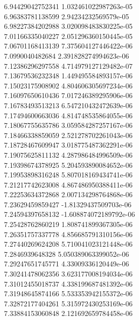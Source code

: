 {6.94429042752341 1.032461022987263e-05 \\
6.96383781138599 2.94234232569579e-05 \\
6.98227384202988 3.020098483830225e-05 \\
7.01166335040227 2.051296360150445e-05 \\
7.06701168413139 7.375604127446422e-06 \\
7.0990040482684 2.391828274994623e-06 \\
7.12386296297558 4.714979127129482e-07 \\
7.13679536232348 1.449495584893157e-06 \\
7.15023175908902 4.804606305697234e-06 \\
7.16097650610436 7.017246389295906e-06 \\
7.16783493513213 6.547210432472639e-06 \\
7.17494600663036 4.814748535864055e-06 \\
7.18067755635786 3.059584287257167e-06 \\
7.18466338859059 2.521278702261043e-06 \\
7.18728467609947 3.018775487362291e-06 \\
7.19075625811132 4.287986484996509e-06 \\
7.19398674378925 5.204593890084652e-06 \\
7.19953898316248 5.807018169434741e-06 \\
7.21217742623008 4.867486950388411e-06 \\
7.22253634372868 2.007134298764868e-06 \\
7.23629459859427 -1.81329437509703e-06 \\
7.24594397658132 -1.608874072189792e-06 \\
7.25428762860219 1.808741899367305e-06 \\
7.26351757337778 4.856685791310156e-06 \\
7.27440269624208 5.710041023121448e-06 \\
7.2846939648328 5.050389063399052e-06 \\
7.29247651745771 4.33009336120449e-06 \\
7.30241478062356 3.623177008194034e-06 \\
7.31012455018737 4.338199687481392e-06 \\
7.31948645874166 5.533353942155372e-06 \\
7.32872177404261 5.315972430253169e-06 \\
7.33884153060848 2.121692659784458e-06 \\
}
